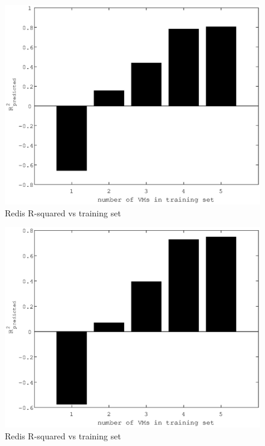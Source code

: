 \documentclass{acm_proc_article-sp}
\begin{document}
\begin{figure}
\centering
\includegraphics[scale = 0.5]{redis_read_bar.eps}
\caption{Redis R-squared vs training set}
\label{figure:redisbarread}
\end{figure}

\begin{figure}
\centering
\includegraphics[scale = 0.5]{redis_write_bar.eps}
\caption{Redis R-squared vs training set}
\label{figure:redisbarwrite}
\end{figure}
\end{document}
